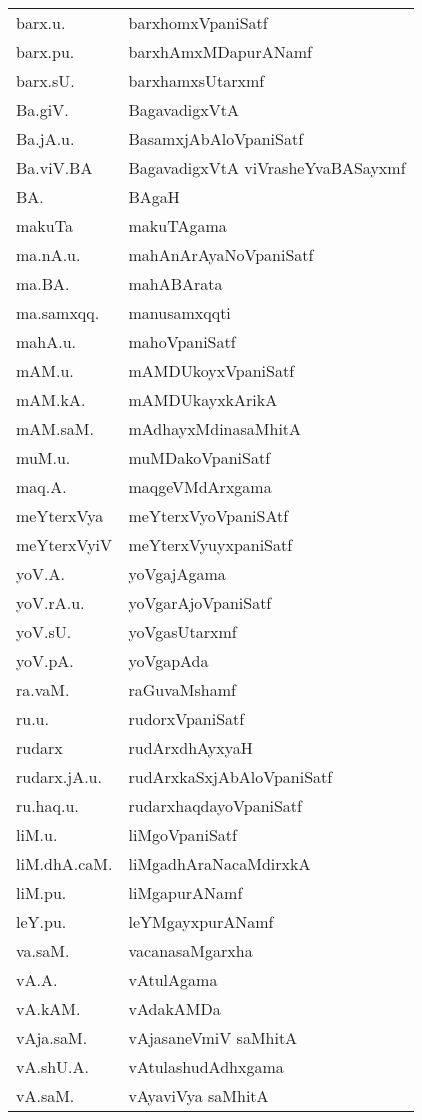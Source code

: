 \begin{longtable}{ll}
barx.u. & barxhomxVpaniSatf\\
barx.pu. & barxhAmxMDapurANamf\\
barx.sU. & barxhamxsUtarxmf\\
Ba.giV. & BagavadigxVtA\\
Ba.jA.u. & BasamxjAbAloVpaniSatf\\
Ba.viV.BA & BagavadigxVtA viVrasheYvaBASayxmf\\
BA. & BAgaH\\
makuTa & makuTAgama\\
ma.nA.u. & mahAnArAyaNoVpaniSatf\\
ma.BA. & mahABArata\\
ma.samxqq. & manusamxqqti\\
mahA.u. & mahoVpaniSatf\\
mAM.u. & mAMDUkoyxVpaniSatf\\
mAM.kA. & mAMDUkayxkArikA\\
mAM.saM. & mAdhayxMdinasaMhitA\\
muM.u. & muMDakoVpaniSatf\\
maq.A. & maqgeVMdArxgama\\
meYterxVya & meYterxVyoVpaniSAtf\\
meYterxVyiV & meYterxVyuyxpaniSatf\\
yoV.A. & yoVgajAgama\\
yoV.rA.u. & yoVgarAjoVpaniSatf\\
yoV.sU. & yoVgasUtarxmf\\
yoV.pA. & yoVgapAda\\
ra.vaM. & raGuvaMshamf\\
ru.u. & rudorxVpaniSatf\\
rudarx & rudArxdhAyxyaH\\
rudarx.jA.u. & rudArxkaSxjAbAloVpaniSatf\\
ru.haq.u. & rudarxhaqdayoVpaniSatf\\
liM.u. & liMgoVpaniSatf\\
liM.dhA.caM. & liMgadhAraNacaMdirxkA\\
liM.pu. & liMgapurANamf\\
leY.pu. & leYMgayxpurANamf\\
va.saM. & vacanasaMgarxha\\
vA.A. & vAtulAgama\\
vA.kAM. & vAdakAMDa\\
vAja.saM. & vAjasaneVmiV saMhitA\\
vA.shU.A. & vAtulashudAdhxgama\\
vA.saM. & vAyaviVya saMhitA\\

\end{longtable}

